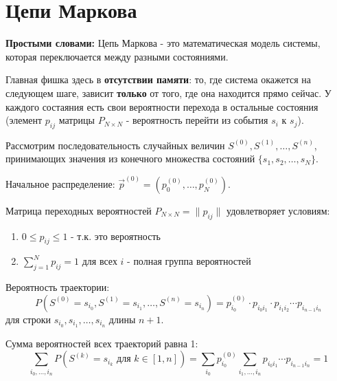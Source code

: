 \section{Цепи Маркова}

\begin{commentary}
    \textbf{Простыми словами:} Цепь Маркова - это математическая модель системы, которая переключается между разными состояниями.
    
    Главная фишка здесь в \textbf{отсутствии памяти}: 
    то, где система окажется на следующем шаге, зависит \textbf{только} от того, где она находится прямо сейчас. 
    У каждого состаяния есть свои вероятности перехода в остальные состояния (элемент $p_{ij}$ матрицы $P_{N \times N}$ - вероятность перейти из события $s_i$ к $s_j$).
\end{commentary}


\begin{definition}
\leavevmode

Рассмотрим последовательность случайных величин $S^{(0)}, S^{(1)}, \dots, S^{(n)}$,\\
принимающих значения из конечного множества состояний $\{s_1, s_2, \dots, s_N\}$.

Начальное распределение: $\vec{p}^{(0)} = (p_0^{(0)}, \dots, p_N^{(0)})$.

Матрица переходных вероятностей $P_{N \times N} = \|p_{ij}\|$ удовлетворяет условиям:
\begin{enumerate}
    \item $0 \le p_{ij} \le 1 $ - т.к. это вероятность
    \item $\sum_{j=1}^{N} p_{ij} = 1$ для всех $i$ - полная группа вероятностей
\end{enumerate}
\end{definition}

\begin{statement}
\leavevmode

Вероятность траектории:
$$ P(S^{(0)} = s_{i_0}, S^{(1)} = s_{i_1}, \dots, S^{(n)} = s_{i_n}) = p_{i_0}^{(0)} \cdot p_{i_0 i_1} \cdot p_{i_1 i_2} \cdots p_{i_{n-1} i_n} $$
для строки $s_{i_0}, s_{i_1}, \dots, s_{i_n}$ длины $n+1$.
\end{statement}

\begin{statement}
Сумма вероятностей всех траекторий равна 1:
$$ \sum_{i_0, \dots, i_n} P(S^{(k)} = s_{i_k} \text{ для } k \in [1, n]) = \sum_{i_0} p_{i_0}^{(0)} \sum_{i_1, \dots, i_n} p_{i_0 i_1} \cdots p_{i_{n-1} i_n} = 1 $$
\end{statement}

